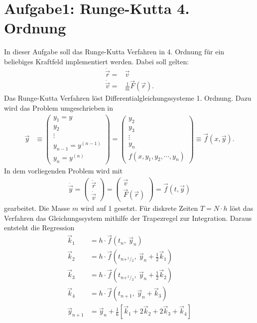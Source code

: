 
\section*{Aufgabe1: Runge-Kutta 4. Ordnung}
In dieser Aufgabe soll das Runge-Kutta Verfahren in 4. Ordnung
für ein beliebiges Kraftfeld implementiert werden.
Dabei soll gelten:
\begin{align}
	\dot{\vec{r}}=&\vec{v}\\
	\dot{\vec{v}}=&\frac{1}{m}\vec{F}(\vec{r}).
\end{align}
Das Runge-Kutta Verfahren löst Differentialgleichungssysteme 1. Ordnung. Dazu wird das Problem umgeschrieben in
\begin{align}
	\vec{y}&\equiv
	\begin{pmatrix}
	y_1=y\\ y_2\\ \vdots\\y_{n-1}=y^{(n-1)}\\ y_n=y^{(n)}
	\end{pmatrix}=
	\begin{pmatrix}
		y_2\\y_3\\\vdots\\y_n\\f(x,y_1,y_2,\cdots,y_n)
	\end{pmatrix}
	\equiv\vec{f}(x,\vec{y}).
\end{align}
In dem vorliegenden Problem wird mit
\begin{align}
	\dot{\vec{y}}=\begin{pmatrix}
		\dot{\vec{r}}\\\dot{\vec{v}}
	\end{pmatrix}
	=
	\begin{pmatrix}
	\vec{v}\\\vec{F}(\vec{r})	
	\end{pmatrix}
	=\vec{f}(t,\vec{y})
\end{align}
gearbeitet.
Die Masse $m$ wird auf 1 gesetzt.
Für diskrete Zeiten $T= N\cdot h$ löst das Verfahren das Gleichungssystem mithilfe der Trapezregel zur Integration.
Daraus entsteht die Regression
\begin{align}
	\vec{k}_1&=h\cdot \vec{f}(t_n ,~\vec{y}_n)\\
	\vec{k}_2&=h\cdot \vec{f}\left(t_{n+^1\!/\!_2},~\vec{y}_n+\frac{1}{2}\vec{k}_1\right)\\
	\vec{k}_3&=h\cdot \vec{f}\left(t_{n+^1\!/\!_2},~\vec{y}_n+\frac{1}{2}\vec{k}_2\right)\\
	\vec{k}_4&=h\cdot \vec{f}\left(t_{n+1},~\vec{y}_n+\vec{k}_3\right)\\
	\vec{y}_{n+1}&=\vec{y}_n + \frac{1}{6}\left[ \vec{k}_1 + 2 \vec{k}_2 +2\vec{k}_3 +\vec{k}_4 \right]
\end{align} 
